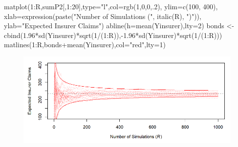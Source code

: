 \documentclass[
]{book}
\newenvironment{Shaded}{\begin{snugshade}}{\end{snugshade}}
\newcommand{\AttributeTok}[1]{\textcolor[rgb]{0.77,0.63,0.00}{#1}}
\newcommand{\DecValTok}[1]{\textcolor[rgb]{0.00,0.00,0.81}{#1}}
\newcommand{\FloatTok}[1]{\textcolor[rgb]{0.00,0.00,0.81}{#1}}
\newcommand{\FunctionTok}[1]{\textcolor[rgb]{0.00,0.00,0.00}{#1}}
\newcommand{\NormalTok}[1]{#1}
\newcommand{\OtherTok}[1]{\textcolor[rgb]{0.56,0.35,0.01}{#1}}
\newcommand{\SpecialCharTok}[1]{\textcolor[rgb]{0.00,0.00,0.00}{#1}}
\newcommand{\StringTok}[1]{\textcolor[rgb]{0.31,0.60,0.02}{#1}}
\begin{document}
\begin{Shaded}
\begin{Highlighting}[]
\FunctionTok{matplot}\NormalTok{(}\DecValTok{1}\SpecialCharTok{:}\NormalTok{R,sumP2[,}\DecValTok{1}\SpecialCharTok{:}\DecValTok{20}\NormalTok{],}\AttributeTok{type=}\StringTok{"l"}\NormalTok{,}\AttributeTok{col=}\FunctionTok{rgb}\NormalTok{(}\DecValTok{1}\NormalTok{,}\DecValTok{0}\NormalTok{,}\DecValTok{0}\NormalTok{,.}\DecValTok{2}\NormalTok{), }\AttributeTok{ylim=}\FunctionTok{c}\NormalTok{(}\DecValTok{100}\NormalTok{, }\DecValTok{400}\NormalTok{),}
        \AttributeTok{xlab=}\FunctionTok{expression}\NormalTok{(}\FunctionTok{paste}\NormalTok{(}\StringTok{"Number of Simulations ("}\NormalTok{, }\FunctionTok{italic}\NormalTok{(}\StringTok{\textquotesingle{}R\textquotesingle{}}\NormalTok{), }\StringTok{")"}\NormalTok{)), }
        \AttributeTok{ylab=}\StringTok{"Expected Insurer Claims"}\NormalTok{)}
\FunctionTok{abline}\NormalTok{(}\AttributeTok{h=}\FunctionTok{mean}\NormalTok{(Yinsurer),}\AttributeTok{lty=}\DecValTok{2}\NormalTok{)}
\NormalTok{bonds }\OtherTok{\textless{}{-}} \FunctionTok{cbind}\NormalTok{(}\FloatTok{1.96}\SpecialCharTok{*}\FunctionTok{sd}\NormalTok{(Yinsurer)}\SpecialCharTok{*}\FunctionTok{sqrt}\NormalTok{(}\DecValTok{1}\SpecialCharTok{/}\NormalTok{(}\DecValTok{1}\SpecialCharTok{:}\NormalTok{R)),}\SpecialCharTok{{-}}\FloatTok{1.96}\SpecialCharTok{*}\FunctionTok{sd}\NormalTok{(Yinsurer)}\SpecialCharTok{*}\FunctionTok{sqrt}\NormalTok{(}\DecValTok{1}\SpecialCharTok{/}\NormalTok{(}\DecValTok{1}\SpecialCharTok{:}\NormalTok{R)))}
\FunctionTok{matlines}\NormalTok{(}\DecValTok{1}\SpecialCharTok{:}\NormalTok{R,bonds}\SpecialCharTok{+}\FunctionTok{mean}\NormalTok{(Yinsurer),}\AttributeTok{col=}\StringTok{"red"}\NormalTok{,}\AttributeTok{lty=}\DecValTok{1}\NormalTok{)}
\end{Highlighting}
\end{Shaded}

\begin{figure}

{\centering \includegraphics[width=1\linewidth]{images/6.1.3-2} 

}

\end{figure}
\end{document}
